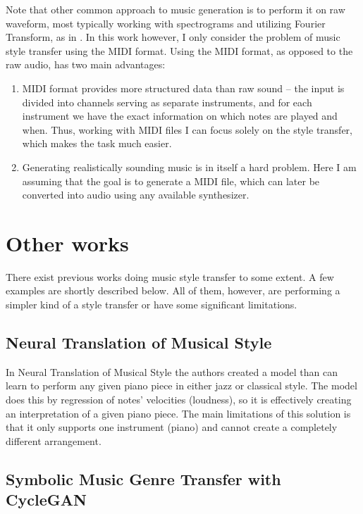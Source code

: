 \documentclass[en]{pracamgr}
\begin{document}
Note that other common approach to music generation is to perform it on raw waveform, most typically working with spectrograms and utilizing Fourier Transform, as in \cite{music_generation}.
In this work however, I only consider the problem of music style transfer using the MIDI format.
Using the MIDI format, as opposed to the raw audio, has two main advantages:

\begin{enumerate}
    \item
    MIDI format provides more structured data than raw sound -- the input is divided into channels serving as separate instruments, and for each instrument we have the exact information on which notes are played and when.
    Thus, working with MIDI files I can focus solely on the style transfer, which makes the task much easier.
    \item
    Generating realistically sounding music is in itself a hard problem.
    Here I am assuming that the goal is to generate a MIDI file, which can later be converted into audio using any available synthesizer.
\end{enumerate}

\section{Other works}

There exist previous works doing music style transfer to some extent.
A few examples are shortly described below.
All of them, however, are performing a simpler kind of a style transfer or have some significant limitations.

\subsection{Neural Translation of Musical Style}

In Neural Translation of Musical Style \cite{neural_translation} the authors created a model than can learn to perform any given piano piece in either jazz or classical style.
The model does this by regression of notes' velocities (loudness), so it is effectively creating an interpretation of a given piano piece.
The main limitations of this solution is that it only supports one instrument (piano) and cannot create a completely different arrangement.

\subsection{Symbolic Music Genre Transfer with CycleGAN}
\end{document}
